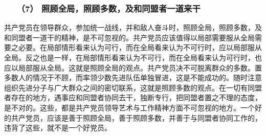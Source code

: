 \documentclass[cn,11pt,chinese]{elegantbook}
\def\myformat#1{\hfil\hfil #1}
\begin{document}
\subsubsection*{\myformat{　　（7） 照顾全局，照顾多数，及和同盟者一道来干}}
共产党员在领导群众，参加统一战线，并和敌人奋斗时，照顾全局，照顾多数，及和同盟者一道干的精神，是不可忽视的。共产党员应该值得以局部需要服从全局需要之必要。在局部情形看来认为可行，而在全局看来认为不可行时，应以局部服从全局。反之也是一样，在局部情形看来认为不可行，而在全局看来认为可行时，也应以局部服从全局。这就是照顾全局的观点。共产党员决不可脱离群众的多数。置多数人的情况于不顾，而率领少数先进队伍单独冒进，这是不能成功的。随时注意组织先进分子与广大群众之间的密切联系，这就是照顾多数的观点。在一切有同盟者存在的地方，遇事应和同盟者协同去干，独断专行，把同盟者置之不理的态度，是不对的。这些，都是共产党员领导艺术与工作精神方面不可忽视的地方。一个好的共产党员，应该是善于照顾全局，善于照顾多数，并善于与同盟者协同工作的，违背了这些，就不是一个好党员。\\
\end{document}

